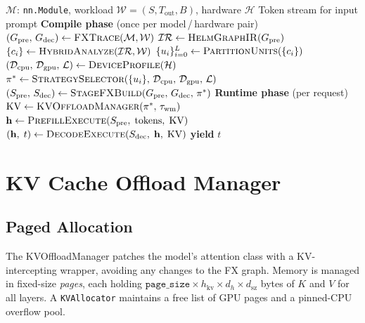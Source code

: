 \documentclass[lettersize,journal]{IEEEtran}
\begin{document}
\begin{algorithm}[t]
\caption{HELM: Heterogeneous Compile and Execute}
\label{alg:helm}
\begin{algorithmic}[1]
\REQUIRE $\mathcal{M}$: \texttt{nn.Module},
         workload $\mathcal{W}{=}(S, T_\text{out}, B)$,
         hardware $\mathcal{H}$
\ENSURE Token stream for input prompt
\vspace{2pt}
\textbf{Compile phase} \textnormal{(once per model\,/\,hardware pair)}
\STATE $(G_\text{pre},\,G_\text{dec}) \leftarrow \textsc{FXTrace}(\mathcal{M}, \mathcal{W})$
\STATE $\mathcal{IR} \leftarrow \textsc{HelmGraphIR}(G_\text{pre})$
\STATE $\{c_i\} \leftarrow \textsc{HybridAnalyze}(\mathcal{IR}, \mathcal{W})$
\STATE $\{u_i\}_{i=0}^{L} \leftarrow \textsc{PartitionUnits}(\{c_i\})$
\STATE $(\mathcal{D}_\text{cpu},\,\mathcal{D}_\text{gpu},\,\mathcal{L}) \leftarrow \textsc{DeviceProfile}(\mathcal{H})$
\STATE $\pi^{*} \leftarrow \textsc{StrategySelector}(\{u_i\},\,\mathcal{D}_\text{cpu},\,\mathcal{D}_\text{gpu},\,\mathcal{L})$
\STATE $(S_\text{pre},\,S_\text{dec}) \leftarrow \textsc{StageFXBuild}(G_\text{pre},\,G_\text{dec},\,\pi^{*})$
\vspace{2pt}
\textbf{Runtime phase} \textnormal{(per request)}
\STATE $\mathrm{KV} \leftarrow \textsc{KVOffloadManager}(\pi^{*},\,\tau_\text{wm})$
\STATE $\mathbf{h} \leftarrow \textsc{PrefillExecute}(S_\text{pre},\;\text{tokens},\;\mathrm{KV})$
  \STATE $(\mathbf{h},\;t) \leftarrow \textsc{DecodeExecute}(S_\text{dec},\;\mathbf{h},\;\mathrm{KV})$
  \STATE \textbf{yield} $t$
\ENDWHILE
\end{algorithmic}
\end{algorithm}

\section{KV Cache Offload Manager}
\label{sec:kv}

\subsection{Paged Allocation}

The KVOffloadManager patches the model's attention class with a
KV-intercepting wrapper, avoiding any changes to the FX graph. Memory is
managed in fixed-size \emph{pages}, each holding
$\texttt{page\_size} \times h_\text{kv} \times d_h \times d_\text{sz}$
bytes of $K$ and $V$ for all layers. A \texttt{KVAllocator} maintains a
free list of GPU pages and a pinned-CPU overflow pool.
\end{document}
